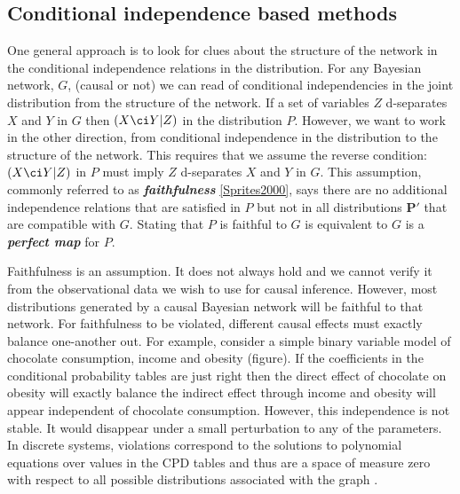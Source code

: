 
\subsection{Conditional independence based methods}
One general approach is to look for clues about the structure of the network in the conditional independence relations in the distribution. For any Bayesian network, $G$, (causal or not) we can read of conditional independencies in the joint distribution from the structure of the network. If a set of variables $Z$ d-separates $X$ and $Y$ in $G$ then $(X \ci Y|Z)$ in the distribution $P$. However, we want to work in the other direction, from conditional independence in the distribution to the structure of the network. This requires that we assume the reverse condition: $(X \ci Y|Z)$ in $P$ must imply $Z$ d-separates $X$ and $Y$ in $G$. This assumption, commonly referred to as  \textbf{\textit{faithfulness}} \ref{Sprites2000}, says there are no additional independence relations that are satisfied in $P$ but not in all distributions $\boldsymbol{P'}$ that are compatible with $G$. Stating that $P$ is faithful to $G$ is equivalent to $G$ is a \textbf{\textit{perfect map}} \citep{pearl1988probabilistic} for $P$.

Faithfulness is an assumption. It does not always hold and we cannot verify it from the observational data we wish to use for causal inference. However, most distributions generated by a causal Bayesian network will be faithful to that network. For faithfulness to be violated, different causal effects must exactly balance one-another out. For example, consider a simple binary variable model of chocolate consumption, income and obesity (figure). If the coefficients in the conditional probability tables are just right then the direct effect of chocolate on obesity will exactly balance the indirect effect through income and obesity will appear independent of chocolate consumption. However, this independence is not stable. It would disappear under a small perturbation to any of the parameters. In discrete systems, violations correspond to the solutions to polynomial equations over values in the CPD tables and thus are a space of measure zero with respect to all possible distributions associated with the graph \citep{Koller2009}. 


